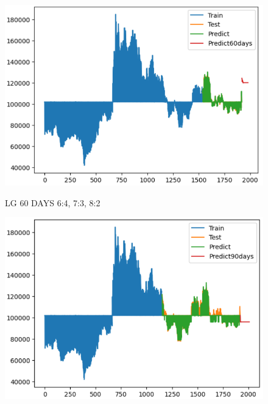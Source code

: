 \documentclass{article}
\begin{document}
\begin{multicols}{2}
\begin{figure}[H]
\begin{minipage}{0.15\textwidth}
    \label{fig:2}
    \end{minipage}%
    \begin{minipage}{0.15\textwidth}
    \centering
    \includegraphics[width=1\textwidth]{Image/XGBoost/LG_8_2_60.png}

    \label{fig:3}
    \end{minipage}
    \caption{LG 60 DAYS  6:4, 7:3, 8:2 }
\end{figure}



\begin{figure}[H]
    \centering
    \begin{minipage}{0.15\textwidth}
    \centering
    \includegraphics[width=1\textwidth]{Image/XGBoost/LG_6_4_90.png}
   

\end{minipage}
\end{figure}
\end{multicols}
\end{document}
